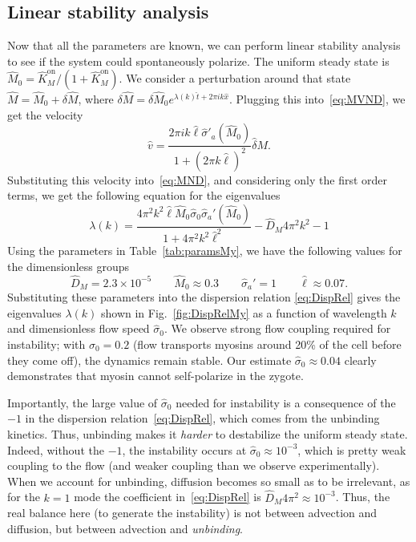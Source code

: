 \documentclass[11pt]{article}
\newcommand{\6}[1]{#1_{\text{6}}}
\newcommand{\3}[1]{#1_{\text{3}}}
\begin{document}
\subsection{Linear stability analysis \label{sec:StabMy}}
Now that all the parameters are known, we can perform linear stability analysis to see if the system could spontaneously polarize. The uniform steady state is $\hat{M}_0= \hat{K}^\text{on}_M/\left(1+\hat{K}^\text{on}_M\right)$. We consider a perturbation around that state $\hat M=\hat{M}_0+\delta \hat M$, where $\delta \hat M = \delta \hat M_0 e^{\lambda(k) \hat{t}+2 \pi i k \hat{x}}$. Plugging this into\ \eqref{eq:MVND}, we get the velocity \cite[Eq.~(11)]{bois2011pattern}
\begin{equation}
\hat v = \frac{2 \pi i k \hat{\ell} \hat{\sigma}'_a(\hat M_0)}{1 + \left(2 \pi k \hat \ell\right)^2} \hat \delta M. 
\end{equation}
Substituting this velocity into\ \eqref{eq:MND}, and considering only the first order terms, we get the following equation for the eigenvalues
\begin{equation}
\label{eq:DispRel}
\lambda(k) = \frac{4\pi^2 k^2 \hat{\ell} \hat{M}_0 \hat{\sigma}_0 \hat \sigma_a'(\hat{M}_0)}{1+4\pi^2 k^2 \hat{\ell}^2} - \hat{D}_M 4 \pi^2 k^2 -1
\end{equation}
Using the parameters in Table\ \ref{tab:paramsMy}, we have the following values for the dimensionless groups
\begin{equation}
\hat{D}_M = 2.3 \times 10^{-5} \qquad \hat{M}_0 \approx 0.3 \qquad \hat \sigma_a'=1 \qquad \hat{\ell} \approx 0.07.
\end{equation}
Substituting these parameters into the dispersion relation \eqref{eq:DispRel} gives the 
eigenvalues $\lambda(k)$ shown in Fig.\ \ref{fig:DispRelMy} as a function of wavelength $k$ and dimensionless flow speed $\hat \sigma_0$. We observe strong flow coupling required for instability; with $\hat{\sigma}_0=0.2$ (flow transports myosins around 20\% of the cell before they come off), the dynamics remain stable. Our estimate $\hat \sigma_0 \approx 0.04$ clearly demonstrates that myosin cannot self-polarize in the zygote. 

Importantly, the large value of $\hat \sigma_0$ needed for instability is a consequence of the $-1$ in the dispersion relation\ \eqref{eq:DispRel}, which comes from the unbinding kinetics. Thus, unbinding makes it \emph{harder} to destabilize the uniform steady state. Indeed, without the $-1$, the instability occurs at $\hat{\sigma}_0 \approx 10^{-3}$, which is pretty weak coupling to the flow (and weaker coupling than we observe experimentally). When we account for unbinding, diffusion becomes so small as to be irrelevant, as for the $k=1$ mode the coefficient in\ \eqref{eq:DispRel} is $\hat{D}_M 4 \pi^2 \approx 10^{-3}$. Thus, the real balance here (to generate the instability) is not between advection and diffusion, but between advection and \emph{unbinding}.
\end{document}
